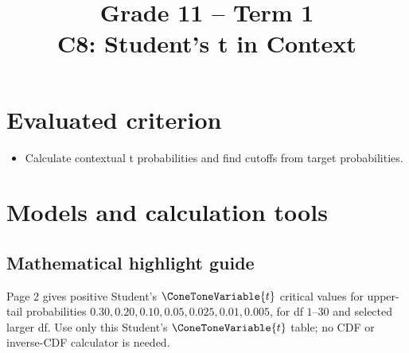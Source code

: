 \makeatletter
{}
\makeatother



\COneTonePracticePalette

\setlength{\parskip}{3pt}\AtBeginDocument{\setlength{\abovedisplayskip}{4pt}\setlength{\belowdisplayskip}{4pt}}
\title{Grade 11 -- Term 1 \\ C8: Student's t in Context}

\author{}\date{}

\maketitle
\setcounter{tocdepth}{1}\setcounter{secnumdepth}{2}
\label{toc}\tableofcontents

\section*{Evaluated criterion}
\begin{itemize}
	\item [\textbf{C8}] Calculate contextual t probabilities and find cutoffs from target probabilities.
\end{itemize}

\section{Models and calculation tools}
\label{sec:tools}
\subsection*{Mathematical highlight guide}
\label{tone:C8:legend}

Page 2 gives positive Student's $\ConeToneVariable{t}$ critical values for upper-tail probabilities
$0.30,0.20,0.10,0.05,0.025,0.01,0.005$, for df $1$--$30$ and selected larger df.
Use only this Student's $\ConeToneVariable{t}$ table; no CDF or inverse-CDF calculator is needed.

